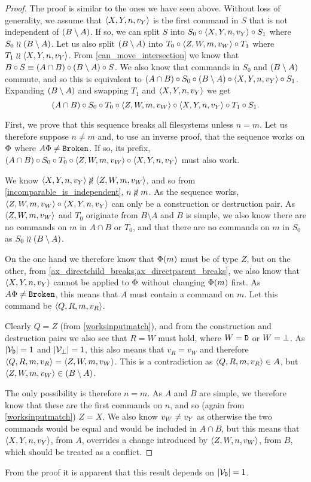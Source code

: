 \begin{proof}
The proof is similar to the ones we have seen above.
Without loss of generality, we assume that $\langle{X,Y,n,v_Y}\rangle$ is the first command in $S$
that is not independent of $(B\setminus A)$.
If so, we can split $S$ into $S_0\circ\langle{X,Y,n,v_Y}\rangle\circ S_1$ where $S_0\mathrel{\wr\wr}(B\setminus A)$.
Let us also split $(B\setminus A)$ into $T_0\circ\langle{Z,W,m,v_W}\rangle\circ T_1$ where $T_1\mathrel{\wr\wr}\langle{X,Y,n,v_Y}\rangle$.
From \cref{can_move_intersection} we know that
$B\circ S \equiv (A\cap B)\circ(B\setminus A)\circ S$.
We also know that commands in $S_0$ and $(B\setminus A)$ commute, and so this is equivalent to
$(A\cap B)\circ S_0\circ(B\setminus A)\circ\langle{X,Y,n,v_Y}\rangle\circ S_1$.
Expanding $(B\setminus A)$ and swapping $T_1$ and $\langle{X,Y,n,v_Y}\rangle$ we get
\[ (A\cap B)\circ S_0\circ T_0 \circ \langle{Z,W,m,v_W}\rangle \circ \langle{X,Y,n,v_Y}\rangle\circ T_1\circ S_1. \]

First, we prove that this sequence breaks all filesystems
unless $n=m$.
Let us therefore suppose $n\neq m$ and, to use an inverse proof,
that the sequence works on $\Phi$ where $A\Phi\neq\mathtt{Broken}$.
If so, its prefix, $(A\cap B)\circ S_0\circ T_0 \circ \langle{Z,W,m,v_W}\rangle \circ \langle{X,Y,n,v_Y}\rangle$ must also work.

We know $\cxynv\nindep\czwmv$, and so from \cref{incomparable_is_independent}, $n\nunrel m$.
As the sequence works, $\langle{Z,W,m,v_W}\rangle\circ\langle{X,Y,n,v_Y}\rangle$ can only be a construction or destruction pair.
As $\langle{Z,W,m,v_W}\rangle$ and $T_0$ originate from $B\setminus A$ and $B$ is simple, we also know there are
no commands on $m$ in $A\cap B$ or $T_0$,
and that there are no commands on $m$ in $S_0$ as $S_0\mathrel{\wr\wr}(B\setminus A)$.

On the one hand we therefore know that $\Phi(m)$ must be of type $Z$,
but on the other, from \cref{ax_directchild_breaks,ax_directparent_breaks},
we also know that $\langle{X,Y,n,v_Y}\rangle$ cannot be applied to $\Phi$ without
changing $\Phi(m)$ first.
As $A\Phi\neq\mathtt{Broken}$, this means that $A$ must contain a command on $m$.
Let this command be $\langle{Q,R,m,v_R}\rangle$.

Clearly $Q=Z$ (from \cref{worksinputmatch}), and from the construction and destruction
pairs we also see that $R=W$ must hold, where $W=\mathtt{D}$ or $W=\bot$.
As $|\mathcal{V}_{\mathtt{D}}|=1$ and $|\mathcal{V}_{\bot}|=1$, this also means that $v_R=v_W$ and therefore
$\langle{Q,R,m,v_R}\rangle = \langle{Z,W,m,v_W}\rangle$.
This is a contradiction as $\langle{Q,R,m,v_R}\rangle\in A$, but $\langle{Z,W,m,v_W}\rangle\in(B\setminus A)$.

The only possibility is therefore $n=m$.
As $A$ and $B$ are simple, we therefore know that these are the first commands on $n$,
and so (again from \cref{worksinputmatch}) $Z=X$.
We also know $v_W\neq v_Y$ as otherwise the two commands would be equal and
would be included in $A\cap B$,
but this means that $\langle{X,Y,n,v_Y}\rangle$, from $A$, overrides a change introduced 
by $\langle{Z,W,n,v_W}\rangle$, from $B$, which should be treated as a conflict.
\end{proof}

From the proof it is apparent that this result depends on $|\mathcal{V}_{\mathtt{D}}|=1$.

